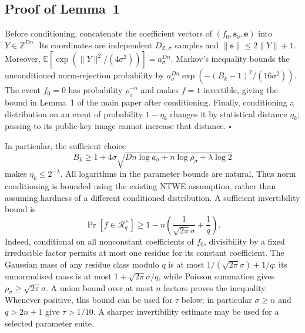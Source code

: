 \documentclass[lettersize,journal]{IEEEtran}
\newenvironment{proof}{{\noindent\it Proof:} }{\hfill $\square$\par}
\begin{document}
\subsection{Proof of Lemma~1}
\label{app:proof-key-conditioning}
\begin{proof}
	Before conditioning, concatenate the coefficient vectors of $(f_0,\mathbf s_0,\mathbf e)$ into $Y\in\mathbb Z^{Dn}$. Its coordinates are independent $D_{\mathbb Z,\sigma}$ samples and $\|\mathbf s\|\le2\|Y\|+1$. Moreover,
	$\mathbb E[\exp(\|Y\|^2/(4\sigma^2))]=a_\sigma^{Dn}$. Markov's inequality bounds the unconditioned norm-rejection probability by $a_\sigma^{Dn}\exp(-(B_k-1)^2/(16\sigma^2))$. The event $f_0=0$ has probability $\rho_\sigma^{-n}$ and makes $f=1$ invertible, giving the bound in Lemma~1 of the main paper after conditioning. Finally, conditioning a distribution on an event of probability $1-\eta_k$ changes it by statistical distance $\eta_k$; passing to its public-key image cannot increase that distance.
\end{proof}

In particular, the sufficient choice
\begin{equation}\label{eq:cyclic-key-choice}
	B_k\ge1+4\sigma\sqrt{Dn\log a_\sigma+n\log\rho_\sigma+\lambda\log2}
\end{equation}
makes $\eta_k\le2^{-\lambda}$. All logarithms in the parameter bounds are natural. Thus norm conditioning is bounded using the existing NTWE assumption, rather than assuming hardness of a different conditioned distribution.
A sufficient invertibility bound is
\begin{equation}\label{eq:cyclic-invertibility}
	\Pr[f\in\mathcal R_q^\times]\ge
	1-n\left(\frac1{\sqrt{2\pi}\sigma}+\frac1q\right).
\end{equation}
Indeed, conditional on all nonconstant coefficients of $f_0$, divisibility by a fixed irreducible factor permits at most one residue for its constant coefficient. The Gaussian mass of any residue class modulo $q$ is at most $1/(\sqrt{2\pi}\sigma)+1/q$: its unnormalised mass is at most $1+\sqrt{2\pi}\sigma/q$, while Poisson summation gives $\rho_\sigma\ge\sqrt{2\pi}\sigma$. A union bound over at most $n$ factors proves the inequality. Whenever positive, this bound can be used for $\tau$ below; in particular $\sigma\ge n$ and $q>2n+1$ give $\tau>1/10$. A sharper invertibility estimate may be used for a selected parameter suite.
\end{document}
